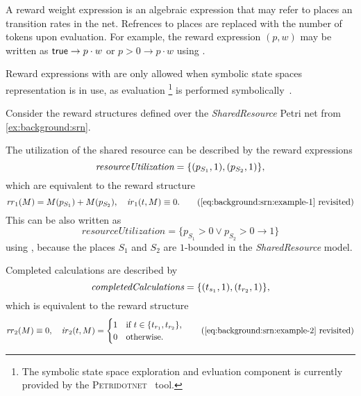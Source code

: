 A reward weight expression is an algebraic expression that may refer
to places an transition rates in the net. Refrences to places are
replaced with the number of tokens upon evaluation. For example, the
reward expression $(p, w)$ may be written as
$\textsf{true} \rightarrow p \cdot w$ or $p > 0 \rightarrow p \cdot w$ using
.

Reward expressions with  are only allowed when symbolic
state spaces representation is in use, as  evaluation%
\footnote{The symbolic state space exploration and 
  evluation component is currently provided by the
  \textsc{Petridotnet}~\citep{Petridotnet} tool.} is performed
symbolically~\citep{TDK2010_Darvas}.

\begin{runningExample}
  Consider the reward structures defined over the
  \emph{Shared\-Resource} Petri net from \vref{ex:background:srn}.

  The utilization of the shared resource can be described by the
  reward expressions
  \begin{equation}
    \textit{resourceUtilization} = \{ (p_{S_1}, 1), (p_{S_2}, 1)\} \text,
  \end{equation}
  which are equivalent to the  reward structure
  \begin{equation}
    \rateReward_1(M) = M(p_{S_1}) + M(p_{S_2}), \quad
    \impulseReward_1(t, M) \equiv 0 \text.
    \tag{\ref{eq:background:srn:example-1} revisited}
  \end{equation}
  This can be also written as
  \begin{equation}
    \textit{resourceUtilization} = \{p_{S_1} > 0 \lor p_{S_2} > 0
    \rightarrow 1\}
  \end{equation}
  using , because the places $S_1$ and $S_2$ are
  $1$-bounded in the \emph{Shared\-Resource} model.

  Completed calculations are described by
  \begin{equation}
    \textit{completedCalculations} = \{ (t_{s_1}, 1), (t_{r_2}, 1)\} \text,
  \end{equation}
  which is equivalent to the reward structure
  \begin{equation}
    \rateReward_2(M) \equiv 0, \quad \impulseReward_2(t, M) = \begin{cases}
      1 & \text{if $t \in \{t_{r_1}, t_{r_2}\}$,} \\
      0 & \text{otherwise.}
    \end{cases}
    \tag{\ref{eq:background:srn:example-2} revisited}
  \end{equation}
\end{runningExample}

